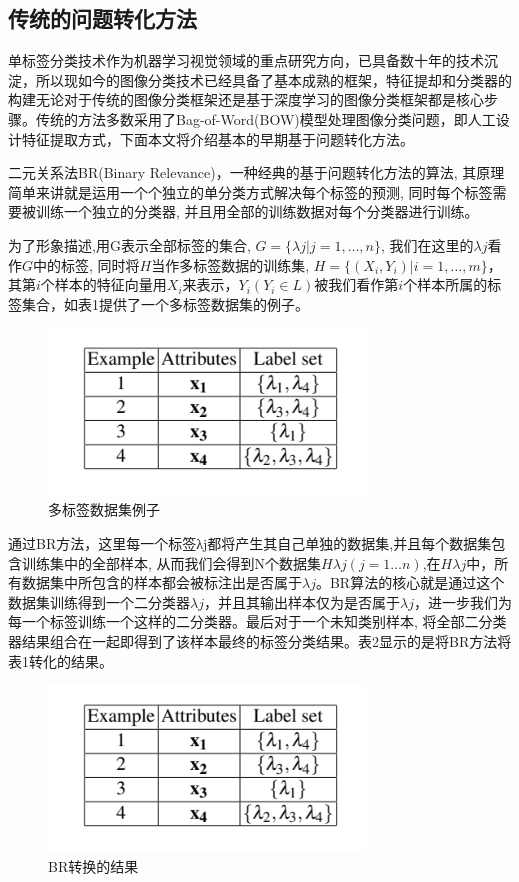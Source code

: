 \subsection{传统的问题转化方法}
单标签分类技术作为机器学习视觉领域的重点研究方向，已具备数十年的技术沉淀，所以现如今的图像分类技术已经具备了基本成熟的框架，特征提却和分类器的构建无论对于传统的图像分类框架还是基于深度学习的图像分类框架都是核心步骤。传统的方法多数采用了Bag-of-Word(BOW)模型处理图像分类问题，即人工设计特征提取方式，下面本文将介绍基本的早期基于问题转化方法。

二元关系法BR(Binary Relevance)，一种经典的基于问题转化方法的算法, 其原理简单来讲就是运用一个个独立的单分类方式解决每个标签的预测, 同时每个标签需要被训练一个独立的分类器, 并且用全部的训练数据对每个分类器进行训练。

为了形象描述,用G表示全部标签的集合, $G=\{\lambda j|j=1, …, n\}$, 我们在这里的$\lambda j$看作$G$中的标签, 同时将$H$当作多标签数据的训练集, $H=\{ (X_i, Y_i) |i=1, …, m\}$，其第$i$个样本的特征向量用$X_i$来表示，$Y_i (Y_i\in L) $被我们看作第$i$个样本所属的标签集合，如表1提供了一个多标签数据集的例子。

\begin{figure}[htbp!]
	\centering
	\includegraphics[width=0.75\textwidth]{figures/p2-1.png}
	\caption{多标签数据集例子}
	\vspace{-1em}
\end{figure}

通过BR方法，这里每一个标签λj都将产生其自己单独的数据集,并且每个数据集包含训练集中的全部样本, 从而我们会得到N个数据集$H\lambda j (j=1…n)$,在$H\lambda j$中，所有数据集中所包含的样本都会被标注出是否属于$\lambda j$。BR算法的核心就是通过这个数据集训练得到一个二分类器$\lambda j$，并且其输出样本仅为是否属于$\lambda j$，进一步我们为每一个标签训练一个这样的二分类器。最后对于一个未知类别样本, 将全部二分类器结果组合在一起即得到了该样本最终的标签分类结果。表2显示的是将BR方法将表1转化的结果。

\begin{figure}[htbp!]
	\centering
	\includegraphics[width=0.75\textwidth]{figures/p2-1.png}
	\caption{BR转换的结果}\label{table}
	\vspace{-1em}
\end{figure}

